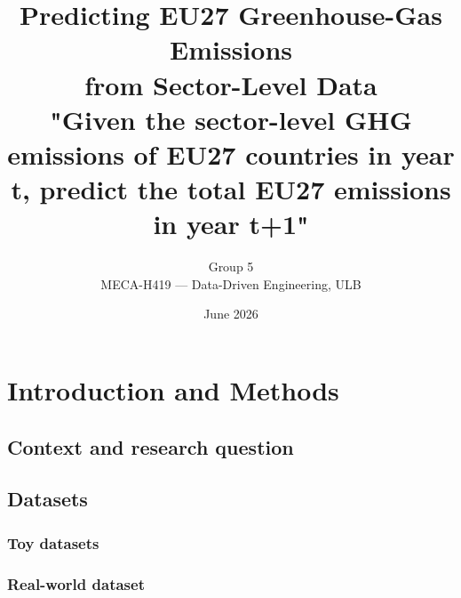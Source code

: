 \documentclass[11pt,a4paper]{article}
\title{Predicting EU27 Greenhouse-Gas Emissions\\
       from Sector-Level Data\\
       "Given the sector-level GHG emissions of EU27 countries in year t, predict the total EU27 emissions in year t+1"}
\author{{Group 5} \\[2pt]
        \small{MECA-H419 — Data-Driven Engineering, ULB}}
\date{June 2026}
\begin{document}
\maketitle

\begin{abstract}
\noindent
\end{abstract}

\tableofcontents
\newpage

\section{Introduction and Methods}\label{sec:intro}

\subsection{Context and research question}\label{sec:context}

\subsection{Datasets}\label{sec:datasets}

\subsubsection{Toy datasets}

\subsubsection{Real-world dataset}
\end{document}
